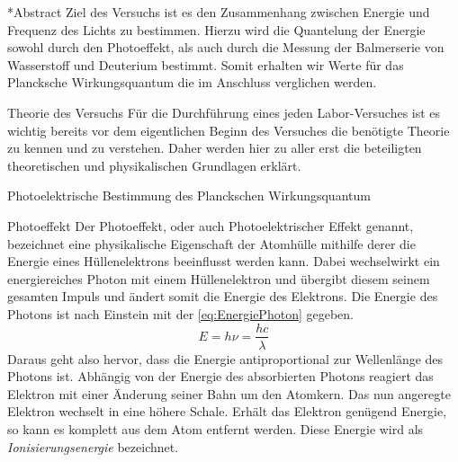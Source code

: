 \documentclass[pdftex, a4paper,11pt, twoside, ngerman]{report}
\begin{document}
  
  
  \begin{chapter}*{Abstract}
    Ziel des Versuchs ist es den Zusammenhang zwischen Energie und Frequenz des Lichts zu bestimmen. Hierzu wird die Quantelung der Energie sowohl durch den Photoeffekt, als auch durch die Messung der Balmerserie von Wasserstoff und Deuterium bestimmt. Somit erhalten wir Werte für das Plancksche Wirkungsquantum die im Anschluss verglichen werden. 
  \end{chapter}
  
  \tableofcontents
  
  
  
  \begin{chapter}{Theorie des Versuchs}
    \label{chp:Theorie}
    Für die Durchführung eines jeden Labor-Versuches ist es wichtig bereits vor dem eigentlichen Beginn des Versuches die benötigte Theorie zu kennen und zu verstehen. Daher werden hier zu aller erst die beteiligten theoretischen und physikalischen Grundlagen erklärt.
    
    
    
    \begin{section}{Photoelektrische Bestimmung des Planckschen Wirkungsquantum}
      \label{chp:TheoriePhotoelektrischesWirkungsquantum}
      
      
      
      \begin{subsection}{Photoeffekt}
        \label{chp:TheoriePhotoelektrischesWirkungsquantumPhotoeffekt}
        Der Photoeffekt, oder auch Photoelektrischer Effekt genannt, bezeichnet eine physikalische Eigenschaft der Atomhülle mithilfe derer die Energie eines Hüllenelektrons beeinflusst werden kann. Dabei wechselwirkt ein energiereiches Photon mit einem Hüllenelektron und übergibt diesem seinem gesamten Impuls und ändert somit die Energie des Elektrons. Die Energie des Photons ist nach Einstein mit der \cref{eq:EnergiePhoton} gegeben.
        \begin{equation}
          \label{eq:EnergiePhoton}
          E=h\nu=\frac{hc}{\lambda}
        \end{equation}
        Daraus geht also hervor, dass die Energie antiproportional zur Wellenlänge des Photons ist. Abhängig von der Energie des absorbierten Photons reagiert das Elektron mit einer Änderung seiner Bahn um den Atomkern. Das nun angeregte Elektron wechselt in eine höhere Schale. Erhält das Elektron genügend Energie, so kann es komplett aus dem Atom entfernt werden. Diese Energie wird als \textit{Ionisierungsenergie} bezeichnet.
        

\end{subsection}
\end{section}
\end{chapter}
\end{document}
